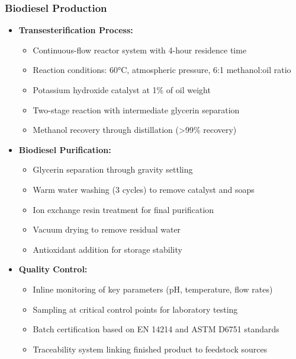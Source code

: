 \subsubsection{Biodiesel Production}
\begin{itemize}
    \item \textbf{Transesterification Process:}
    \begin{itemize}
        \item Continuous-flow reactor system with 4-hour residence time
        \item Reaction conditions: 60°C, atmospheric pressure, 6:1 methanol:oil ratio
        \item Potassium hydroxide catalyst at 1\% of oil weight
        \item Two-stage reaction with intermediate glycerin separation
        \item Methanol recovery through distillation (>99\% recovery)
    \end{itemize}
    
    \item \textbf{Biodiesel Purification:}
    \begin{itemize}
        \item Glycerin separation through gravity settling
        \item Warm water washing (3 cycles) to remove catalyst and soaps
        \item Ion exchange resin treatment for final purification
        \item Vacuum drying to remove residual water
        \item Antioxidant addition for storage stability
    \end{itemize}
    
    \item \textbf{Quality Control:}
    \begin{itemize}
        \item Inline monitoring of key parameters (pH, temperature, flow rates)
        \item Sampling at critical control points for laboratory testing
        \item Batch certification based on EN 14214 and ASTM D6751 standards
        \item Traceability system linking finished product to feedstock sources
    \end{itemize}
\end{itemize}

